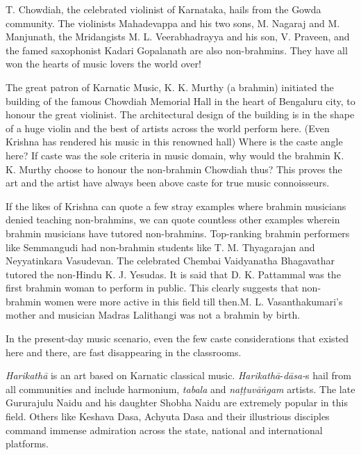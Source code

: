 T. Chowdiah, the celebrated violinist of Karnataka, hails from the Gowda community. The violinists Mahadevappa and his two sons, M. Nagaraj and M. Manjunath, the Mridangists M. L. Veerabhadrayya and his son, V. Praveen, and the famed saxophonist Kadari Gopalanath are also non-brahmins. They have all won the hearts of music lovers the world over!

The great patron of Karnatic Music, K. K. Murthy (a brahmin) initiated the building of the famous Chowdiah Memorial Hall in the heart of Bengaluru city, to honour the great violinist. The architectural design of the building is in the shape of a huge violin and the best of artists across the world perform here. (Even Krishna has rendered his music in this renowned hall) Where is the caste angle here? If caste was the sole criteria in music domain, why would the brahmin K. K. Murthy choose to honour the non-brahmin Chowdiah thus? This proves the art and the artist have always been above caste for true music connoisseurs.

If the likes of Krishna can quote a few stray examples where brahmin musicians denied teaching non-brahmins, we can quote countless other examples wherein brahmin musicians have tutored non-brahmins. Top-ranking brahmin performers like Semmangudi had non-brahmin students like T. M. Thyagarajan and Neyyatinkara Vasudevan. The celebrated Chembai Vaidyanatha Bhagavathar tutored the non-Hindu K. J. Yesudas. It is said that D. K. Pattammal was the first brahmin woman to perform in public. This clearly suggests that non-brahmin women were more active in this field till then.\break M. L. Vasanthakumari’s mother and musician Madras Lalithangi was not a brahmin by birth.

In the present-day music scenario, even the few caste considerations that existed here and there, are fast disappearing in the classrooms.

\textit{Harikathā} is an art based on Karnatic classical music. \textit{Harikathā}-\textit{dāsa-}s hail from all communities and include harmonium, \textit{tabala} and \textit{naṭṭuvāṅgam} artists. The late Gururajulu Naidu and his daughter Shobha Naidu are extremely popular in this field. Others like Keshava Dasa, Achyuta Dasa and their illustrious disciples command immense admiration across the state, national and international platforms.

